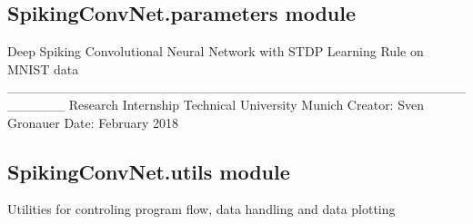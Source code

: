 \documentclass[letterpaper,10pt,english]{sphinxmanual}
\begin{document}
\subsection{SpikingConvNet.parameters module}
\label{\detokenize{SpikingConvNet:spikingconvnet-parameters-module}}\label{\detokenize{SpikingConvNet:module-SpikingConvNet.parameters}}
Deep Spiking Convolutional Neural Network
with STDP Learning Rule on MNIST data
\_\_\_\_\_\_\_\_\_\_\_\_\_\_\_\_\_\_\_\_\_\_\_\_\_\_\_\_\_\_\_\_\_\_\_\_\_\_\_\_\_\_\_\_\_\_\_\_\_\_\_\_\_\_
Research Internship
Technical University Munich
Creator:    Sven Gronauer
Date:       February 2018


\subsection{SpikingConvNet.utils module}
\label{\detokenize{SpikingConvNet:spikingconvnet-utils-module}}\label{\detokenize{SpikingConvNet:module-SpikingConvNet.utils}}
Utilities for controling program flow, data handling and data plotting
\end{document}
